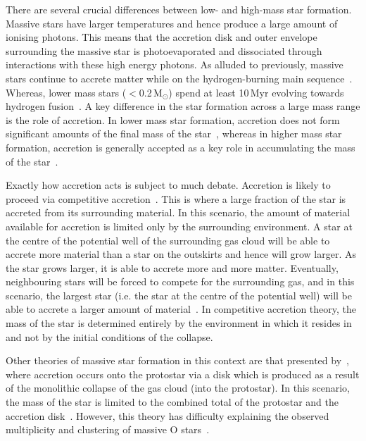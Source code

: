 {There are several crucial differences between low- and high-mass star formation.\footnotemark~
Massive stars have larger temperatures and hence produce a large amount of ionising photons.
This means that the accretion disk and outer envelope surrounding the massive star is photoevaporated and dissociated through interactions with these high energy photons.
As alluded to previously, massive stars continue to accrete matter while on the hydrogen-burning main sequence~\citep{Zinnecker07}.
Whereas, lower mass stars ($<$0.2\,M$_{\odot}$) spend at least 10\,Myr evolving towards hydrogen fusion~\citep{Luhman12}.
A key difference in the star formation across a large mass range is the role of accretion.
In lower mass star formation, accretion does not form significant amounts of the final mass of the star~\citep{Bonnell08}, whereas in higher mass star formation, accretion is generally accepted as a key role in accumulating the mass of the star~\citep{Kraus10}.


Exactly how accretion acts is subject to much debate.
Accretion is likely to proceed via competitive accretion~\citep{Bonnell01}.
This is where a large fraction of the star is accreted from its surrounding material.
In this scenario, the amount of material available for accretion is limited only by the surrounding environment.
A star at the centre of the potential well of the surrounding gas cloud will be able to accrete more material than a star on the outskirts and hence will grow larger.
As the star grows larger, it is able to accrete more and more matter.
Eventually, neighbouring stars will be forced to compete for the surrounding gas, and in this scenario, the largest star (i.e. the star at the centre of the potential well) will be able to accrete a larger amount of material~\citep[for a useful economical analogy -- the rich get richer --, see Section 4.2 of][]{Zinnecker07}.
In competitive accretion theory, the mass of the star is determined entirely by the environment in which it resides in and not by the initial conditions of the collapse.

Other theories of massive star formation in this context are that presented by~\cite{Yorke02}, where accretion occurs onto the protostar via a disk which is produced as a result of the monolithic collapse of the gas cloud (into the protostar).
In this scenario, the mass of the star is limited to the combined total of the protostar and the accretion disk~\citep{Zinnecker07}.
However, this theory has difficulty explaining the observed multiplicity and clustering of massive O stars~\citep{Zinnecker07, Sana12, 2012ARA&A..50..531K}.

}
